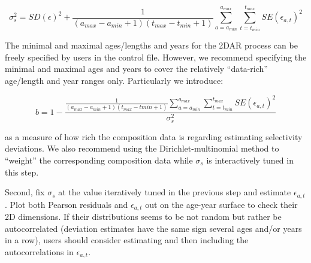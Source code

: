 \begin{equation}
\sigma_s^2=SD(\epsilon)^2+\frac{1}{(a_{max}-a_{min}+1)(t_{max}-t_{min}+1)}\sum_{a=a_{min}}^{a_{max}}\sum_{t=t_{min}}^{t_{max}}SE(\epsilon_{a,t})^2
\end{equation}

The minimal and maximal ages/lengths and years for the 2DAR process can be freely specified by users in the control file. However, we recommend specifying the minimal and maximal ages and years to cover the relatively ``data-rich'' age/length and year ranges only. Particularly we introduce: 

\begin{equation}
b=1-\frac{\frac{1}{(a_{max}-a_{min}+1)(t_{max}-t{min}+1)}\sum_{a=a_{min}}^{a_{max}}\sum_{t=t_{min}}^{t_{max}}SE(\epsilon_{a,t})^2}{\sigma_s^2}
\end{equation}

as a measure of how rich the composition data is regarding estimating selectivity deviations. We also recommend using the Dirichlet-multinomial method to ``weight'' the corresponding composition data while $\sigma_s$ is interactively tuned in this step.

Second, fix $\sigma_s$ at the value iteratively tuned in the previous step and estimate $\epsilon_{a,t}$. Plot both Pearson residuals and $\epsilon_{a,t}$ out on the age-year surface to check their 2D dimensions. If their distributions seems to be not random but rather be autocorrelated (deviation estimates have the same sign several ages and/or years in a row), users should consider estimating and then including the autocorrelations in $\epsilon_{a,t}$.


\hypertarget{continuous-seasonal-recruitment-sec}{}
